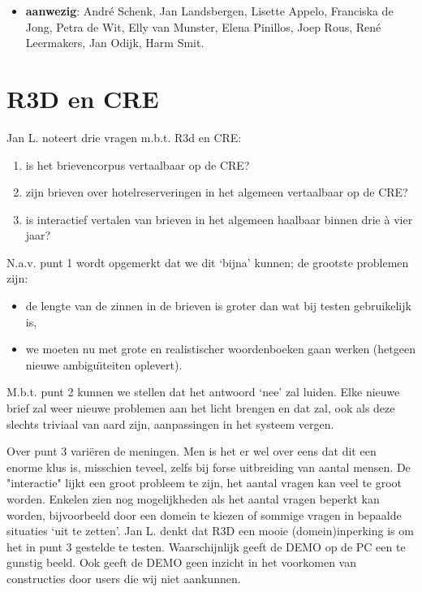 
   \RosDate{\today}
   \RosSupersedes{-}
   \MakeRosTitle
\begin{itemize}
  \item {\bf aanwezig}: Andr\'{e} Schenk, Jan Landsbergen, Lisette Appelo,
                     Franciska de Jong, Petra de Wit, Elly van Munster, 
                     Elena Pinillos, Joep Rous, Ren\'{e} Leermakers,
                     Jan Odijk, Harm Smit.
\end{itemize}

\section{R3D en CRE}

Jan L. noteert drie vragen m.b.t. R3d en CRE:
\begin{enumerate}
  \item is het brievencorpus vertaalbaar op de CRE?
  \item zijn brieven over hotelreserveringen in het algemeen vertaalbaar op 
        de CRE?
  \item is interactief vertalen van brieven in het algemeen haalbaar binnen 
        drie \`{a} vier jaar?
\end{enumerate}

N.a.v. punt 1 wordt opgemerkt dat we dit `bijna' kunnen; 
de grootste problemen zijn:
\begin{itemize}
  \item de lengte van de zinnen in de brieven is groter dan wat bij testen 
        gebruikelijk is,
  \item we moeten nu met grote en realistischer woordenboeken gaan werken
        (hetgeen nieuwe ambigu\"{\i}teiten oplevert).
        
\end{itemize}
M.b.t. punt 2 kunnen we stellen dat het antwoord `nee' zal luiden. Elke nieuwe
brief zal weer nieuwe problemen aan het licht brengen en dat zal, ook als deze 
slechts triviaal van aard zijn, aanpassingen in het systeem vergen.

Over punt 3 vari\"{e}ren de meningen. Men is het er wel over eens dat dit een 
enorme klus is, misschien teveel, zelfs bij forse uitbreiding van aantal mensen.
De "interactie" lijkt een groot probleem te zijn, het aantal vragen kan veel te 
groot worden. Enkelen zien nog mogelijkheden als het aantal vragen beperkt kan 
worden, bijvoorbeeld door een domein te kiezen of sommige vragen 
in bepaalde situaties `uit te zetten'. Jan L. denkt dat R3D een mooie 
(domein)inperking is om het in punt 3 gestelde te testen. 
Waarschijnlijk geeft de DEMO op de PC een te gunstig beeld. Ook geeft de DEMO 
geen inzicht in het voorkomen van constructies door users die wij niet 
aankunnen.

